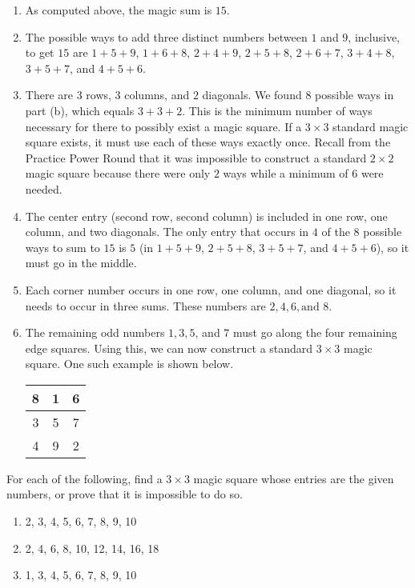 \documentclass[11pt]{article}
\renewenvironment{problem}{\begin{problems}}{\end{problems}\vspace{5pt}}
\begin{document}
\begin{solution}
\begin{enumerate}[label=(\alph*)]
\item As computed above, the magic sum is $\boxed{15}$.

\item The possible ways to add three distinct numbers between $1$ and $9$, inclusive, to get $15$ are $1+5+9$, 
$1+6+8$, $2+4+9$, $2+5+8$, $2+6+7$, $3+4+8$, $3+5+7$, and $4+5+6$.

\item There are $3$ rows, $3$ columns, and $2$ diagonals. We found $\boxed{8}$ possible ways in part (b), which
equals $3+3+2$. This is the minimum number of ways necessary for there to possibly exist a magic square.
If a $3 \times 3$ standard magic square exists, it must use each of these ways exactly once.
Recall from the Practice Power Round that it was impossible to construct a standard $2 \times 2$ magic square
because there were only $2$ ways while a minimum of $6$ were needed.

\item The center entry (second row, second column) is included in one row, one column, and two diagonals.
The only entry that occurs in $4$ of the $8$ possible ways to sum to $15$ is $\boxed{5}$ (in $1+5+9$, $2+5+8$,
$3+5+7$, and $4+5+6$), so it must go in the middle.

\item Each corner number occurs in one row, one column, and one diagonal, so it needs to occur in three sums.
These numbers are $\boxed{2, 4, 6, \text{and } 8}$.

\item The remaining odd numbers $1, 3, 5$, and $7$ must go along the four remaining edge squares.
Using this, we can now construct a standard $3 \times 3$ magic square. One such example is shown below.
\begin{center}
\begin{tabular}{|c|c|c|}
\hline
8 & 1 & 6 \\ \hline
3 & 5 & 7 \\ \hline
4 & 9 & 2 \\ \hline
\end{tabular}
\end{center}
\end{enumerate}
\end{solution}


\begin{problem}[12=4+4+4 points]
For each of the following, find a $3 \times 3$ magic square whose entries are the given numbers, or prove that it is impossible to do so.
\begin{enumerate}[label=(\alph*)]
\item 2, 3, 4, 5, 6, 7, 8, 9, 10

\item 2, 4, 6, 8, 10, 12, 14, 16, 18

\item 1, 3, 4, 5, 6, 7, 8, 9, 10
\end{enumerate}
\end{problem}
\end{document}
